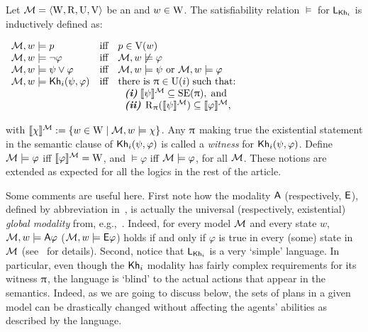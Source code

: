 \begin{definition}\label{def:sem-esm}
Let $\mathcal{M}=\langle \operatorname{W},\operatorname{R},\operatorname{U},\operatorname{V} \rangle$ be an \ults and $w \in \operatorname{W}$.
The satisfiability relation $\models$ for $\mathsf{L}_{{\sf Kh}_i}$ is inductively defined as:
\begin{spcenter}
$\begin{array}{l@{\ \ \ }c@{\ \ \  }l}
\modults, w \models p & \text{iff} & p \in \V(w) \\
\modults, w \models \neg\varphi & \text{iff} & \modults, w \not\models \varphi \\
\modults, w \models \psi\vee\varphi & \text{iff} & \modults, w \models \psi \mbox{ or }\modults, w \models \varphi \\
\modults, w \models \khi(\psi,\varphi) & \text{iff} & \text{there is } \plans \in \Unc(i) \;\text{such that:} \\
& & \ \ \text{\bfseries \itshape (i)} \; \truthset{\modults}{\psi} \subseteq \stexec(\plans),\; \text{and} \\
& & \ \ \text{\bfseries \itshape (ii)} \; \R_\plans(\truthset{\modults}{\psi}) \subseteq \truthset{\modults}{\varphi},
\end{array}$
\end{spcenter}
with $\llbracket \chi \rrbracket^{\mathcal{M}} := \{ w\in\operatorname{W} \mid \mathcal{M},w\models\chi \}$. Any $\uppi$ making true the existential statement in the semantic clause of ${\sf Kh}_i(\psi,\varphi)$ is called a \emph{witness} for ${\sf Kh}_i(\psi,\varphi)$. Define $\mathcal{M}\models\varphi$ iff  $\llbracket \varphi \rrbracket^{\mathcal{M}}=\operatorname{W}$, and $\models\varphi$ iff $\mathcal{M}\models\varphi$, for all \ults $\mathcal{M}$. These notions are extended as expected for all the logics in the rest of the article.
\end{definition}

\medskip

Some comments are useful here. First note how the modality ${\sf A}$ (respectively, ${\sf E}$), defined by abbreviation in~, is actually the universal (respectively, existential) \emph{global modality} from, e.g.,~\cite{GorankoP92}. Indeed, for every model $\mathcal{M}$ and every state $w$, $\mathcal{M},w\models{\sf A}\varphi$ ($\mathcal{M},w\models{\sf E}\varphi$) holds if and only if $\varphi$ is true in every (some) state in $\mathcal{M}$ (see~\cite{AFSVQ21,AFSVQ23report} for details). %
Second, notice that $\mathsf{L}_{{\sf Kh}_i}$ is a very `simple' language. In particular, even though the ${\sf Kh}_i$ modality has fairly complex requirements for its witness $\uppi$, the language is `blind' to the actual actions that appear in the semantics.  Indeed, as we are going to discuss below, the sets of plans in a given model can be drastically changed without affecting the agents' abilities as described by the language. 

